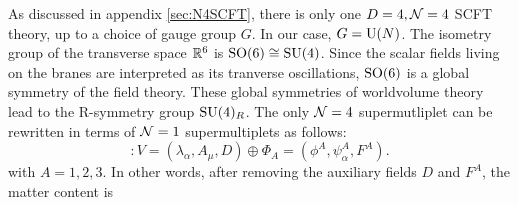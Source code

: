         As discussed in appendix \ref{sec:N4SCFT}, there is only one $D=4,\mathcal{N}=4$ SCFT theory, up to a choice of gauge group $G$. In our case, $G=\text{U}(N)$. The isometry group of the transverse space $\mathbb{R}^6$ is $\text{SO}(6)\cong\text{SU}(4)$. Since the scalar fields living on the branes are interpreted as its tranverse oscillations, $\text{SO}(6)$ is a global symmetry of the field theory. These global symmetries of worldvolume theory lead to the R-symmetry group $\text{SU}(4)_R$. The only $\mathcal{N}=4$ supermutliplet can be rewritten in terms of $\mathcal{N}=1$ supermultiplets as follows:
        \begin{equation}
            [\mN = 4 \text{ vector multiplet}] : V = (\lambda_\alpha, A_\mu, D) \oplus \Phi_A = (\phi^A,\psi^A_\alpha,F^A).
        \end{equation}
        with $A=1,2,3$. In other words, after removing the auxiliary fields $D$ and $F^A$, the matter content is
